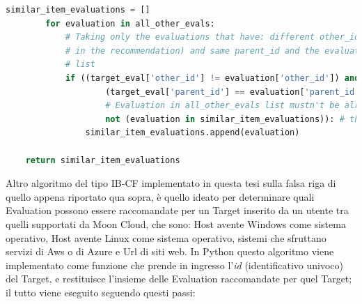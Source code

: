 \begin{itemize}
\begin{lstlisting}[language=Python, label=lst:IB_CF_Evaluation_3]
        similar_item_evaluations = []
        for evaluation in all_other_evals:
            # Taking only the evaluations that have: different other_id (excluding the target evaluation
            # in the recommendation) and same parent_id and the evaluations that weren't added to similar_item_evaluations
            # list
            if ((target_eval['other_id'] != evaluation['other_id']) and  # Evaluations must have different 'other_id'
                    (target_eval['parent_id'] == evaluation['parent_id']) and  # Evaluations must have same 'parent_id'
                    # Evaluation in all_other_evals list mustn't be already added to \
                    not (evaluation in similar_item_evaluations)): # the 'similar_item_evaluations' list
                similar_item_evaluations.append(evaluation)
    
    return similar_item_evaluations 
    \end{lstlisting}
\end{itemize}
Altro algoritmo del tipo IB-CF implementato in questa tesi sulla falsa riga di quello appena riportato qua sopra, è quello ideato per 
determinare quali Evaluation possono essere raccomandate per un Target inserito da un utente tra quelli supportati da Moon Cloud, 
che sono: Host avente Windows come sistema operativo, Host avente Linux come sistema operativo, sistemi che sfruttano 
servizi di Aws o di Azure e Url di siti web.\hfill\break
In Python questo algoritmo viene implementato come funzione che prende in ingresso l'\textit{id} (identificativo univoco) del Target, e 
restituisce l'insieme delle Evaluation raccomandate per quel Target; il tutto viene eseguito seguendo questi passi:
